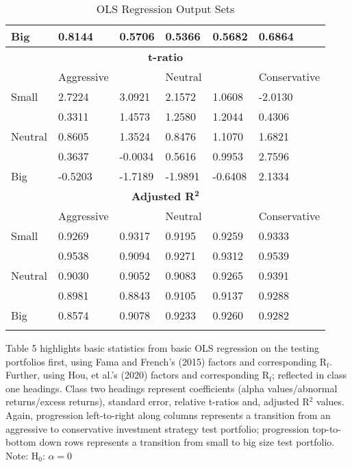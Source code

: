 \documentclass[11pt, english]{article}
\begin{document}
\begin{center}
\begin{longtable}{ p{1.5cm} | p{1.5cm} p{1.5cm} p{1.5cm} p{1.5cm} p{1.5cm} }
        Big & 0.8144 & 0.5706 & 0.5366 & 0.5682 & 0.6864\\
        \hline
        \multicolumn{6}{c}{\textbf{t-ratio}}\\
        \hline
        & Aggressive & & Neutral & & Conservative\\
        \hline
        Small & 2.7224 & 3.0921 & 2.1572 & 1.0608 & -2.0130\\
        & 0.3311 & 1.4573 & 1.2580 & 1.2044 & 0.4306\\
        Neutral & 0.8605 & 1.3524 & 0.8476 & 1.1070 & 1.6821\\
        & 0.3637 & -0.0034 & 0.5616 & 0.9953 & 2.7596\\ 
        Big & -0.5203 & -1.7189 & -1.9891 & -0.6408 & 2.1334\\
        \hline
        \multicolumn{6}{c}{\textbf{Adjusted R$\mathbf{^2}$}}\\
        \hline
        & Aggressive & & Neutral & & Conservative\\
        \hline
        Small & 0.9269 & 0.9317 & 0.9195 & 0.9259 & 0.9333\\ 
        & 0.9538 & 0.9094 & 0.9271 & 0.9312 & 0.9539\\
        Neutral & 0.9030 & 0.9052 & 0.9083 & 0.9265 & 0.9391\\
        & 0.8981 & 0.8843 & 0.9105 & 0.9137 & 0.9288\\
        Big & 0.8574 & 0.9078 & 0.9233 & 0.9260 & 0.9282\\
        \hline
        \caption{OLS Regression Output Sets}
\end{longtable}
\end{center}

Table 5 highlights basic statistics from basic OLS regression on the testing portfolios first, using Fama and French's (2015) factors and corresponding R$\mathrm{_f}$. Further, using Hou, et al.'s (2020) factors and corresponding R$\mathrm{_f}$; reflected in class one headings. Class two headings represent coefficients (alpha values/abnormal returns/excess returns), standard error, relative t-ratios and, adjusted R$^2$ values. Again, progression left-to-right along columns represents a transition from an aggressive to conservative investment strategy test portfolio; progression top-to-bottom down rows represents a transition from small to big size test portfolio.\\

Note: $\mathrm{H_0}$: $\alpha=0$

\newpage
\end{document}
